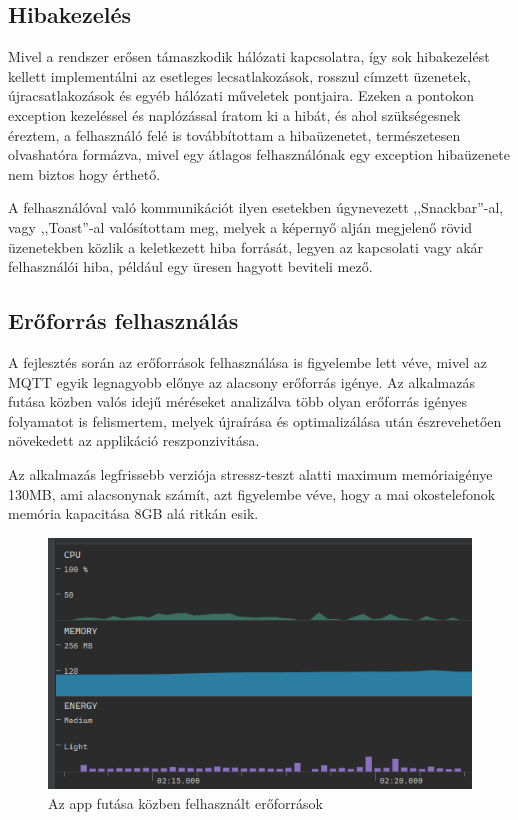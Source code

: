 \documentclass[]{thesis-ekf}
\theoremstyle{definition}
\theoremstyle{remark}
\begin{document}
\subsection{Hibakezelés}
Mivel a rendszer erősen támaszkodik hálózati kapcsolatra, így sok hibakezelést kellett implementálni az esetleges
lecsatlakozások, rosszul címzett üzenetek, újracsatlakozások és egyéb hálózati műveletek pontjaira. Ezeken a pontokon
exception kezeléssel és naplózással íratom ki a hibát, és ahol szükségesnek éreztem, a felhasználó felé is továbbítottam
a hibaüzenetet, természetesen olvashatóra formázva, mivel egy átlagos felhasználónak egy exception hibaüzenete
nem biztos hogy érthető. 

A felhasználóval való kommunikációt ilyen esetekben úgynevezett ,,Snackbar''-al, vagy ,,Toast''-al
valósítottam meg, melyek a képernyő alján megjelenő rövid üzenetekben közlik a keletkezett hiba forrását, legyen az
kapcsolati vagy akár felhasználói hiba, például egy üresen hagyott beviteli mező.

\subsection{Erőforrás felhasználás}
A fejlesztés során az erőforrások felhasználása is figyelembe lett véve, mivel az MQTT egyik legnagyobb előnye
az alacsony erőforrás igénye. Az alkalmazás  futása közben valós idejű méréseket analizálva több olyan
erőforrás igényes folyamatot is felismertem, melyek újraírása és optimalizálása után észrevehetően növekedett
az applikáció reszponzivitása.

Az alkalmazás legfrissebb verziója stressz-teszt alatti maximum memóriaigénye 130MB, ami alacsonynak számít, azt
figyelembe véve, hogy a mai okostelefonok memória kapacitása 8GB alá ritkán esik.
\begin{figure}[ht]
	\centering
	\label{profiler}
	\includegraphics{images/profiler.png}
	\caption{Az app futása közben felhasznált erőforrások}
\end{figure}
\end{document}
